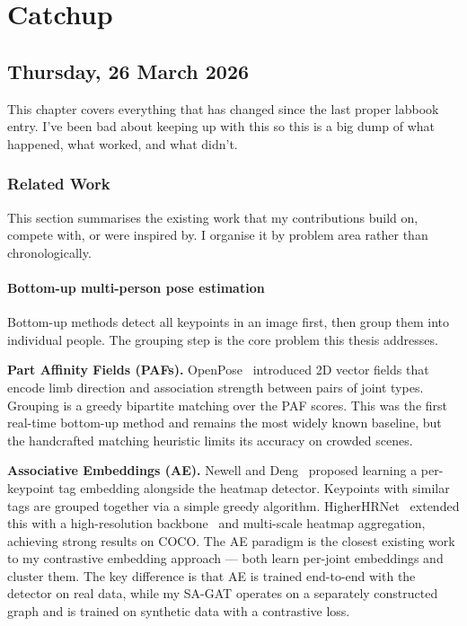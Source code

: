 \chapter[Catchup]{Catchup}

\section[2026/03/26]{Thursday, 26 March 2026}
\label{sec:20260326}

This chapter covers everything that has changed since the last proper labbook entry. I've been bad about keeping up with this so this is a big dump of what happened, what worked, and what didn't.


\subsection{Related Work}

This section summarises the existing work that my contributions build on, compete with, or were inspired by. I organise it by problem area rather than chronologically.

\subsubsection{Bottom-up multi-person pose estimation}

Bottom-up methods detect all keypoints in an image first, then group them into individual people. The grouping step is the core problem this thesis addresses.

\textbf{Part Affinity Fields (PAFs).} OpenPose~\cite{cao2017openpose} introduced 2D vector fields that encode limb direction and association strength between pairs of joint types. Grouping is a greedy bipartite matching over the PAF scores. This was the first real-time bottom-up method and remains the most widely known baseline, but the handcrafted matching heuristic limits its accuracy on crowded scenes.

\textbf{Associative Embeddings (AE).} Newell and Deng~\cite{newell2017associative} proposed learning a per-keypoint tag embedding alongside the heatmap detector. Keypoints with similar tags are grouped together via a simple greedy algorithm. HigherHRNet~\cite{cheng2020higherhrnet} extended this with a high-resolution backbone~\cite{sun2019hrnet} and multi-scale heatmap aggregation, achieving strong results on COCO. The AE paradigm is the closest existing work to my contrastive embedding approach --- both learn per-joint embeddings and cluster them. The key difference is that AE is trained end-to-end with the detector on real data, while my SA-GAT operates on a separately constructed graph and is trained on synthetic data with a contrastive loss.

